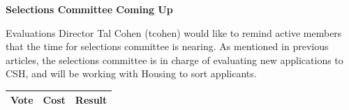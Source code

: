 \documentclass[9pt]{extarticle} %
\begin{document}
\begin{minipage}[t]{.30\linewidth}
\begin{mdframed}[style=sidebar,frametitle={}]
\textbf{Selections Committee Coming Up}

Evaluations Director Tal Cohen (tcohen) would like to remind active members that the time for selections committee is nearing. As mentioned in previous articles, the selections committee is in charge of evaluating new applications to CSH, and will be working with Housing to sort applicants.


\begin{tabular}{lcr}

Vote & Cost & Result \\
\midrule
\bottomrule
\end{tabular}


\end{mdframed}
\end{minipage}\hfill %
%
%
\end{document}
